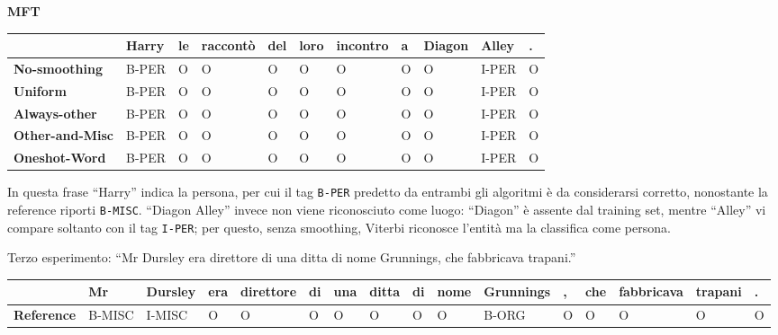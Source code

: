 \documentclass[a4paper,11pt,notitlepage]{report}
\begin{document}
\begin{center}\textbf{MFT}\end{center}
\begin{center}
\scriptsize
\setlength{\tabcolsep}{3pt}
\begin{tabular}{|l|l|l|l|l|l|l|l|l|l|l|}
\hline
\textbf{} & \textbf{Harry} & \textbf{le} & \textbf{raccontò} & \textbf{del} & \textbf{loro} & \textbf{incontro} & \textbf{a} & \textbf{Diagon} & \textbf{Alley} & \textbf{.} \\ \hline
\textbf{No-smoothing} & B-PER & O & O & O & O & O & O & O & I-PER & O \\ \hline
\textbf{Uniform} & B-PER & O & O & O & O & O & O & O & I-PER & O \\ \hline
\textbf{Always-other} & B-PER & O & O & O & O & O & O & O & I-PER & O \\ \hline
\textbf{Other-and-Misc} & B-PER & O & O & O & O & O & O & O & I-PER & O \\ \hline
\textbf{Oneshot-Word} & B-PER & O & O & O & O & O & O & O & I-PER & O \\ \hline
\end{tabular}
\end{center}

In questa frase ``Harry'' indica la persona, per cui il tag \texttt{B-PER} predetto da entrambi gli algoritmi è da considerarsi corretto, nonostante la reference riporti \texttt{B-MISC}. ``Diagon Alley'' invece non viene riconosciuto come luogo: ``Diagon'' è assente dal training set, mentre ``Alley'' vi compare soltanto con il tag \texttt{I-PER}; per questo, senza smoothing, Viterbi riconosce l'entità ma la classifica come persona.

Terzo esperimento: ``Mr Dursley era direttore di una ditta di nome Grunnings, che fabbricava trapani.''

\begin{center}
\scriptsize
\setlength{\tabcolsep}{1.5pt}
\begin{tabular}{|l|l|l|l|l|l|l|l|l|l|l|l|l|l|l|l|}
\hline
\textbf{} & \textbf{Mr} & \textbf{Dursley} & \textbf{era} & \textbf{direttore} & \textbf{di} & \textbf{una} & \textbf{ditta} & \textbf{di} & \textbf{nome} & \textbf{Grunnings} & \textbf{,} & \textbf{che} & \textbf{fabbricava} & \textbf{trapani} & \textbf{.} \\ \hline
\textbf{Reference} & B-MISC & I-MISC & O & O & O & O & O & O & O & B-ORG & O & O & O & O & O \\ \hline
\end{tabular}
\end{center}
\end{document}
